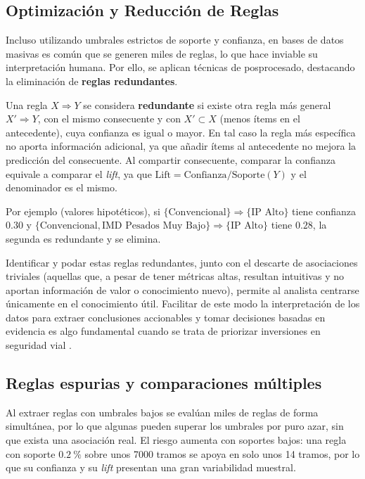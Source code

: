 \documentclass[twoside,a4paper,12pt,onecolumn,openany]{book}
\begin{document}
\subsection{Optimización y Reducción de Reglas}

Incluso utilizando umbrales estrictos de soporte y confianza, en bases de datos masivas es común que se generen miles de reglas, lo que hace inviable su interpretación humana. Por ello, se aplican técnicas de posprocesado, destacando la eliminación de \textbf{reglas redundantes}. 

\vspace{0.5cm}

Una regla $X\Rightarrow Y$ se considera \textbf{redundante} si existe otra regla más general $X'\Rightarrow Y$, con el mismo consecuente y con $X'\subset X$ (menos ítems en el antecedente), cuya confianza es igual o mayor. En tal caso la regla más específica no aporta información adicional, ya que añadir ítems al antecedente no mejora la predicción del consecuente. Al compartir consecuente, comparar la confianza equivale a comparar el \textit{lift}, ya que $\text{Lift}=\text{Confianza}/\text{Soporte}(Y)$ y el denominador es el mismo. 

\vspace{0.5cm}

Por ejemplo (valores hipotéticos), si $\{\text{Convencional}\}\Rightarrow\{\text{IP Alto}\}$ tiene confianza $0.30$ y $\{\text{Convencional},\text{IMD Pesados Muy Bajo}\}\Rightarrow\{\text{IP Alto}\}$ tiene $0.28$, la segunda es redundante y se elimina.

\vspace{0.5cm}

Identificar y podar estas reglas redundantes, junto con el descarte de asociaciones triviales (aquellas que, a pesar de tener métricas altas, resultan intuitivas y no aportan información de valor o conocimiento nuevo), permite al analista centrarse únicamente en el conocimiento útil. Facilitar de este modo la interpretación de los datos para extraer conclusiones accionables y tomar decisiones basadas en evidencia es algo fundamental cuando se trata de priorizar inversiones en seguridad vial \cite{apuntes_teoria2025}.

\subsection{Reglas espurias y comparaciones múltiples}

Al extraer reglas con umbrales bajos se evalúan miles de reglas de forma simultánea, por lo que algunas pueden superar los umbrales por puro azar, sin que exista una asociación real. El riesgo aumenta con soportes bajos: una regla con soporte $0.2\ \%$ sobre unos 7000 tramos se apoya en solo unos 14 tramos, por lo que su confianza y su \textit{lift} presentan una gran variabilidad muestral.
\end{document}
